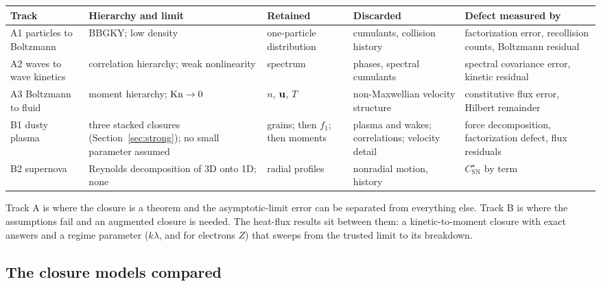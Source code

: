 \begin{center}
\renewcommand{\arraystretch}{1.3}
\small
\begin{tabularx}{\textwidth}{@{}P{2.3cm}P{2.6cm}P{2.5cm}P{2.5cm}Y@{}}
\toprule
Track & Hierarchy and limit & Retained & Discarded & Defect measured by \\
\midrule
A1 particles to Boltzmann
  & BBGKY; low density
  & one-particle distribution
  & cumulants, collision history
  & factorization error, recollision counts, Boltzmann residual \\
A2 waves to wave kinetics
  & correlation hierarchy; weak nonlinearity
  & spectrum
  & phases, spectral cumulants
  & spectral covariance error, kinetic residual \\
A3 Boltzmann to fluid
  & moment hierarchy; $\mathrm{Kn}\to0$
  & $n$, $\mathbf{u}$, $T$
  & non-Maxwellian velocity structure
  & constitutive flux error, Hilbert remainder \\
B1 dusty plasma
  & three stacked closures (Section~\ref{sec:strong}); no small parameter
    assumed
  & grains; then $f_1$; then moments
  & plasma and wakes; correlations; velocity detail
  & force decomposition, factorization defect, flux residuals \\
B2 supernova
  & Reynolds decomposition of 3D onto 1D; none
  & radial profiles
  & nonradial motion, history
  & $C^\star_{\mathrm{SN}}$ by term \\
\bottomrule
\end{tabularx}
\end{center}
Track A is where the closure is a theorem and the asymptotic-limit error
can be separated from everything else. Track B is where the assumptions
fail and an augmented closure is needed. The heat-flux results sit between
them: a kinetic-to-moment closure with exact answers and a regime
parameter ($k\lambda$, and for electrons $Z$) that sweeps from the trusted
limit to its breakdown.

\subsection{The closure models compared}

